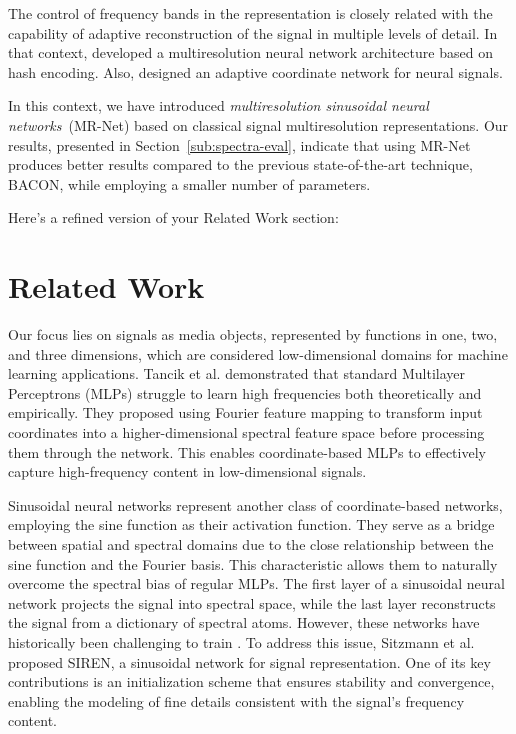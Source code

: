 The control of frequency bands in the representation is closely related with the capability of adaptive reconstruction of the signal in multiple levels of detail. In that context, \citet{mueller2022instant} developed a multiresolution neural network architecture based on hash encoding. Also, \citet{martel2021acorn} designed an adaptive coordinate network for neural signals.

In this context, we have introduced \textit{multiresolution sinusoidal neural networks}~(MR-Net) \cite{paz2022,perez2003} based on classical signal multiresolution representations. 
Our results, presented in Section~\ref{sub:spectra-eval}, indicate that using MR-Net produces better results compared to the previous state-of-the-art technique, BACON, while employing a smaller number of parameters.


Here’s a refined version of your Related Work section:

\section{Related Work}

Our focus lies on signals as media objects, represented by functions in one, two, and three dimensions, which are considered low-dimensional domains for machine learning applications. Tancik et al. \cite{tancik2020fourfeat} demonstrated that standard Multilayer Perceptrons (MLPs) struggle to learn high frequencies both theoretically and empirically. They proposed using Fourier feature mapping to transform input coordinates into a higher-dimensional spectral feature space before processing them through the network. This enables coordinate-based MLPs to effectively capture high-frequency content in low-dimensional signals.

Sinusoidal neural networks represent another class of coordinate-based networks, employing the sine function as their activation function. They serve as a bridge between spatial and spectral domains due to the close relationship between the sine function and the Fourier basis. This characteristic allows them to naturally overcome the spectral bias of regular MLPs. The first layer of a sinusoidal neural network projects the signal into spectral space, while the last layer reconstructs the signal from a dictionary of spectral atoms. However, these networks have historically been challenging to train \cite{taming2017}. To address this issue, Sitzmann et al. \cite{sitzmann2019siren} proposed SIREN, a sinusoidal network for signal representation. One of its key contributions is an initialization scheme that ensures stability and convergence, enabling the modeling of fine details consistent with the signal’s frequency content.

